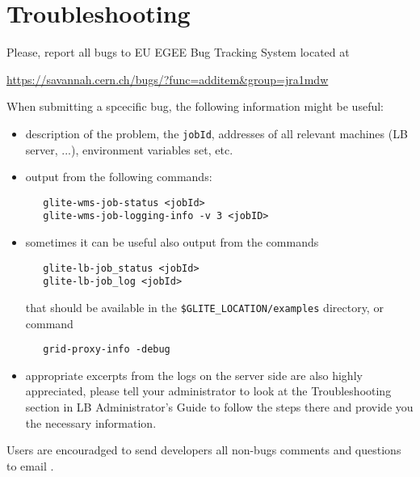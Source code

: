 \section{Troubleshooting}

Please, report all bugs to EU EGEE Bug Tracking System located at
\begin{center}
\url{https://savannah.cern.ch/bugs/?func=additem&group=jra1mdw}
\end{center}

When submitting a \LB spcecific bug, the following information might be useful:
\begin{itemize}
\item description of the problem, the \verb'jobId', addresses of all relevant
 machines (LB server, ...), environment variables set, etc.
\item output from the following commands:
\begin{verbatim}
   glite-wms-job-status <jobId>
   glite-wms-job-logging-info -v 3 <jobID>
\end{verbatim}
\item sometimes it can be useful also output from the commands
\begin{verbatim}
   glite-lb-job_status <jobId>
   glite-lb-job_log <jobId>
\end{verbatim}
that should be available in the \verb'$GLITE_LOCATION/examples' directory,
or command
\begin{verbatim}
   grid-proxy-info -debug
\end{verbatim}
\item appropriate excerpts from the logs on the server side are also highly appreciated, 
please tell your administrator to look at the Troubleshooting section in LB Administrator's 
Guide \cite{lbag} to follow the steps there and provide you the necessary information.
\end{itemize}

Users are encouradged to send developers all non-bugs comments and questions to email
.

